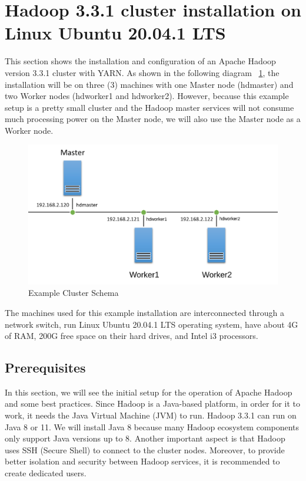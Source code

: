 \documentclass[12pt,english]{book}
\begin{document}
\section{Hadoop 3.3.1 cluster installation on Linux Ubuntu 20.04.1 LTS}


This section shows the installation and configuration of an Apache Hadoop version 3.3.1 cluster with YARN. As shown in the following diagram ~\ref{fig:clusterSchema}, the installation will be on three (3) machines with one Master node (hdmaster) and two Worker nodes (hdworker1 and hdworker2).
However, because this example setup is a pretty small cluster and the Hadoop master services will not consume much processing power on the Master node, we will also use the Master node as a Worker node.

\begin{figure}[ht]
	\centering
	\includegraphics[width=\linewidth]{clusterSchema}
	\caption{Example Cluster Schema}
\label{fig:clusterSchema}
\end{figure}

The machines used for this example installation are interconnected through a network switch, run Linux Ubuntu 20.04.1 LTS operating system, have about 4G of RAM, 200G free space on their hard drives, and Intel i3 processors.


\subsection{Prerequisites}


In this section, we will see the initial setup for the operation of Apache Hadoop and some best practices.
Since Hadoop is a Java-based platform, in order for it to work, it needs the Java Virtual Machine (JVM) to run.
Hadoop 3.3.1 can run on Java 8 or 11.
We will install Java 8 because many Hadoop ecosystem components only support Java versions up to 8.
Another important aspect is that Hadoop uses SSH (Secure Shell) to connect to the cluster nodes.
Moreover, to provide better isolation and security between Hadoop services, it is recommended to create dedicated users.
\end{document}
